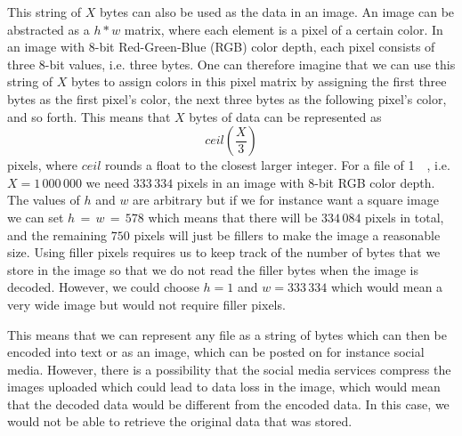 
This string of $X$ bytes can also be used as the data in an image. An image can be abstracted as a $h * w$ matrix, where each element is a pixel of a certain color. In an image with 8-bit Red-Green-Blue (RGB) color depth, each pixel consists of three 8-bit values, i.e. three bytes. One can therefore imagine that we can use this string of $X$ bytes to assign colors in this pixel matrix by assigning the first three bytes as the first pixel's color, the next three bytes as the following pixel's color, and so forth. This means that $X$ bytes of data can be represented as 
$$ceil(\frac{X}{3})$$ 
pixels, where $ceil$ rounds a float to the closest larger integer. For a file of \SI{1}{\mega\byte}, i.e. $X = 1\,000\,000$ we need $333\,334$ pixels in an image with 8-bit RGB color depth. The values of $h$ and $w$ are arbitrary but if we for instance want a square image we can set $ h\,=\,w\,=\,578$ which means that there will be $334\,084$ pixels in total, and the remaining $750$ pixels will just be fillers to make the image a reasonable size. Using filler pixels requires us to keep track of the number of bytes that we store in the image so that we do not read the filler bytes when the image is decoded. However, we could choose $h = 1$ and $w = 333\,334$ which would mean a very wide image but would not require filler pixels. 

This means that we can represent any file as a string of bytes which can then be encoded into text or as an image, which can be posted on for instance social media. However, there is a possibility that the social media services compress the images uploaded which could lead to data loss in the image, which would mean that the decoded data would be different from the encoded data. In this case, we would not be able to retrieve the original data that was stored.